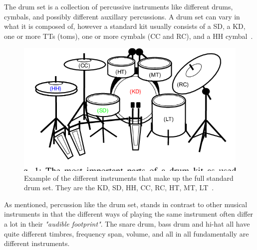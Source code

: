 The drum set is a collection of percussive instruments like different drums, cymbals, and possibly different auxillary percussions. A drum set can vary in what it is composed of, however a standard kit usually consists of a \gls{SD}, a \gls{KD}, one or more \glspl{TT} (toms), one or more cymbals (\gls{CC} and \gls{RC}), and a \gls{HH} cymbal~\cite{TheDrumHandbook2003}.

\begin{figure}[H]
    \centering
    \includegraphics[scale=0.7, trim={0 1cm 0 0},clip]{figures/drumset}
    \caption{Example of the different instruments that make up the full standard drum set. They are the \acrfull{KD}, \acrfull{SD}, \acrfull{HH}, \acrfull{CC}, \acrfull{RC}, \acrfull{HT}, \acrfull{MT}, \acrfull{LT}~\cite{8350302}.}
    \label{DrumsetFigure}
\end{figure}

As mentioned, percussion like the drum set, stands in contrast to other musical instruments in that the different ways of playing the same instrument often differ a lot in their \textit{"audible footprint"}. The snare drum, bass drum and hi-hat all have quite different timbres, frequency span, volume, and all in all fundamentally are different instruments.

